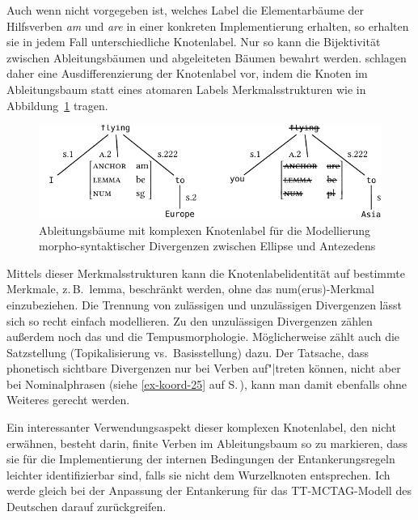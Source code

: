 Auch wenn nicht vorgegeben ist, welches Label die Elementarbäume der Hilfsverben {\it am} und {\it are} in einer konkreten Implementierung erhalten, so erhalten sie in jedem Fall unterschiedliche Knotenlabel. Nur so kann die Bijektivität zwischen Ableitungsbäumen und abgeleiteten Bäumen bewahrt werden. 
\cite{Lichte:Kallmeyer:10} schlagen daher eine Ausdifferenzierung der Knotenlabel vor, indem die Knoten im Ableitungsbaum statt eines atomaren Labels Merkmalsstrukturen wie in Abbildung~\ref{fig-deanchoring-9} tragen. 
\begin{figure}[t]
\centering
\includegraphics{graphics/abb822.pdf}
\caption{\label{fig-deanchoring-9}Ableitungsbäume mit komplexen Knotenlabel für die Modellierung morpho-syntaktischer Divergenzen zwischen Ellipse und Antezedens \citep[(7)]{Lichte:Kallmeyer:10}}
\end{figure}
Mittels dieser Merkmalsstrukturen kann die Knotenlabelidentität auf bestimmte Merkmale, z.\,B.\ {\sc lemma}, beschränkt werden, ohne das {\sc num(erus)}-Merkmal einzubeziehen. Die Trennung von zulässigen und unzulässigen Divergenzen lässt sich so recht einfach modellieren. Zu den unzulässigen Divergenzen zählen \cite{Lichte:Kallmeyer:10} au\ss erdem noch das  und die Tempusmorphologie. Möglicherweise zählt auch die Satzstellung (Topikalisierung vs.\ Basisstellung) dazu. Der Tatsache, dass phonetisch sichtbare Divergenzen nur bei Verben auf"|treten können, nicht aber bei Nominalphrasen (siehe \ref{ex-koord-25} auf S.\,\pageref{ex-koord-25}), kann man damit ebenfalls ohne Weiteres gerecht werden.

Ein interessanter Verwendungsaspekt dieser komplexen Knotenlabel, den \cite{Lichte:Kallmeyer:10} nicht erwähnen, besteht darin, finite Verben im Ableitungsbaum so zu markieren, dass sie für die Implementierung der internen Bedingungen der Entankerungsregeln leichter identifizierbar sind, falls sie nicht dem Wurzelknoten entsprechen. Ich werde gleich bei der Anpassung der Entankerung für das TT-MCTAG-Modell des Deutschen darauf zurückgreifen.

